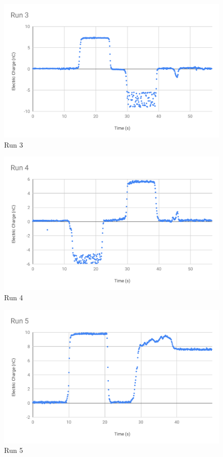 \begin{figure}[ht]
	\centering
	\includegraphics[scale=0.74]{image/01-electro/Run3.pdf}
	\caption{Run 3}
	\label{figure.01.run.3}
\end{figure}
\begin{figure}[ht]
	\centering
	\includegraphics[scale=0.74]{image/01-electro/Run4.pdf}
	\caption{Run 4}
	\label{figure.01.run.4}
\end{figure}
\begin{figure}[ht]
	\centering
	\includegraphics[scale=0.74]{image/01-electro/Run5.pdf}
	\caption{Run 5}
	\label{figure.01.run.5}
\end{figure}
